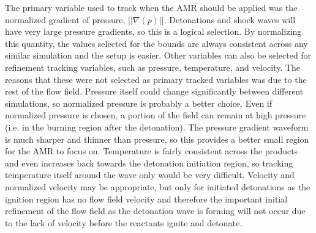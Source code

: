 The primary variable used to track when the AMR should be applied was the normalized gradient of pressure, \( ||\nabla(p)||\). Detonations  and shock waves will have very large pressure gradients, so this is a logical selection. By normalizing this quantity, the values selected for the bounds are always consistent across any similar simulation and the setup is easier. Other variables can also be selected for refinement tracking variables, such as pressure, temperature, and velocity. The reasons that these were not selected as primary tracked variables was due to the rest of the flow field. Pressure itself could change significantly between different simulations, so normalized pressure is probably a better choice. Even if normalized pressure is chosen, a portion of the field can remain at high pressure (i.e. in the burning region after the detonation). The pressure gradient waveform is much sharper and thinner than pressure, so this provides a better small region for the AMR to focus on. Temperature is fairly consistent across the products and even increases back towards the detonation initiation region, so tracking temperature itself around the wave only would be very difficult. Velocity and normalized velocity may be appropriate, but only for initiated detonations as the ignition region has no flow field velocity and therefore the important initial refinement of the flow field as the detonation wave is forming will not occur due to the lack of velocity before the reactants ignite and detonate. 

